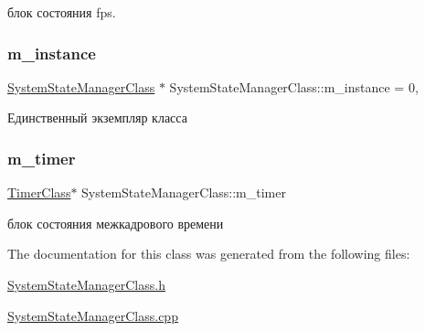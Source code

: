 блок состояния fps. 

\mbox{\label{class_system_state_manager_class_a39700084963f2d7f4fd63d6049a09de2}} 
\subsubsection{\texorpdfstring{m\+\_\+instance}{m\_instance}}
{\footnotesize\ttfamily \hyperlink{class_system_state_manager_class}{System\+State\+Manager\+Class} $\ast$ System\+State\+Manager\+Class\+::m\+\_\+instance = 0\hspace{0.3cm}{\ttfamily [static]}, {\ttfamily [private]}}



Единственный экземпляр класса 

\mbox{\label{class_system_state_manager_class_a86f7046c272727db4655c3ad3b0aa507}} 
\subsubsection{\texorpdfstring{m\+\_\+timer}{m\_timer}}
{\footnotesize\ttfamily \hyperlink{class_timer_class}{Timer\+Class}$\ast$ System\+State\+Manager\+Class\+::m\+\_\+timer\hspace{0.3cm}{\ttfamily [private]}}



блок состояния межкадрового времени 



The documentation for this class was generated from the following files\+:\begin{DoxyCompactItemize}
\item 
\hyperlink{_system_state_manager_class_8h}{System\+State\+Manager\+Class.\+h}\item 
\hyperlink{_system_state_manager_class_8cpp}{System\+State\+Manager\+Class.\+cpp}\end{DoxyCompactItemize}

